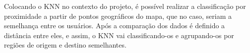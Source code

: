 Colocando o KNN no contexto do projeto, é possível realizar a classificação por  proximidade a partir de pontos geográficos do mapa, que no caso, seriam a semelhança entre os usuários. Após a comparação dos dados é definido a distância entre eles, e assim, o KNN vai classificando-os e agrupando-os por regiões de origem e destino semelhantes.

